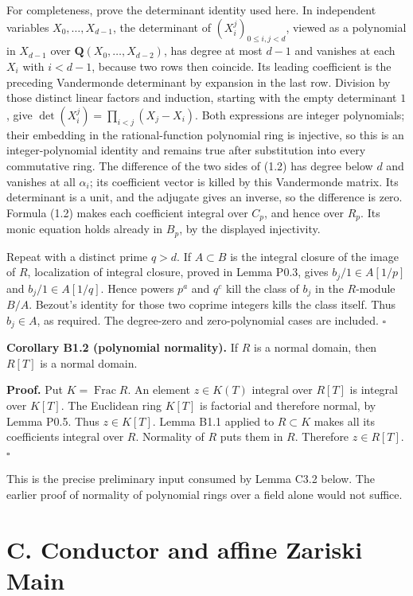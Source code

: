 \documentclass[11pt,a4paper,openany]{report}
\begin{document}
For completeness, prove the determinant identity used here. In independent variables \(X_0,\ldots,X_{d-1}\), the determinant of \((X_i^j)_{0\le i,j<d}\), viewed as a polynomial in \(X_{d-1}\) over \(\mathbf Q(X_0,\ldots,X_{d-2})\), has degree at most \(d-1\) and vanishes at each \(X_i\) with \(i<d-1\), because two rows then coincide. Its leading coefficient is the preceding Vandermonde determinant by expansion in the last row. Division by those distinct linear factors and induction, starting with the empty determinant \(1\), give \(\det(X_i^j)=\prod_{i<j}(X_j-X_i)\). Both expressions are integer polynomials; their embedding in the rational-function polynomial ring is injective, so this is an integer-polynomial identity and remains true after substitution into every commutative ring. The difference of the two sides of (1.2) has degree below \(d\) and vanishes at all \(\alpha_i\); its coefficient vector is killed by this Vandermonde matrix. Its determinant is a unit, and the adjugate gives an inverse, so the difference is zero. Formula (1.2) makes each coefficient integral over \(C_p\), and hence over \(R_p\). Its monic equation holds already in \(B_p\), by the displayed injectivity.

Repeat with a distinct prime \(q>d\). If \(A\subset B\) is the integral closure of the image of \(R\), localization of integral closure, proved in Lemma P0.3, gives \(b_j/1\in A[1/p]\) and \(b_j/1\in A[1/q]\). Hence powers \(p^a\) and \(q^c\) kill the class of \(b_j\) in the \(R\)-module \(B/A\). Bezout's identity for those two coprime integers kills the class itself. Thus \(b_j\in A\), as required. The degree-zero and zero-polynomial cases are included. \(\square\)

\textbf{Corollary B1.2 (polynomial normality).} If \(R\) is a normal domain, then \(R[T]\) is a normal domain.

\textbf{Proof.} Put \(K=\operatorname{Frac}R\). An element \(z\in K(T)\) integral over \(R[T]\) is integral over \(K[T]\). The Euclidean ring \(K[T]\) is factorial and therefore normal, by Lemma P0.5. Thus \(z\in K[T]\). Lemma B1.1 applied to \(R\subset K\) makes all its coefficients integral over \(R\). Normality of \(R\) puts them in \(R\). Therefore \(z\in R[T]\). \(\square\)

This is the precise preliminary input consumed by Lemma C3.2 below. The earlier proof of normality of polynomial rings over a field alone would not suffice.

\section{C. Conductor and affine Zariski Main}\label{AG-RG-S04-c.-conductor-and-affine-zariski-main}
\end{document}
